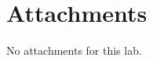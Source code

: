 \documentclass[12pt]{report}
\begin{document}
\section{Attachments}\label{section: Attachments}
No attachments for this lab.
\vspace*{\fill}

% 
% 


\end{document}
